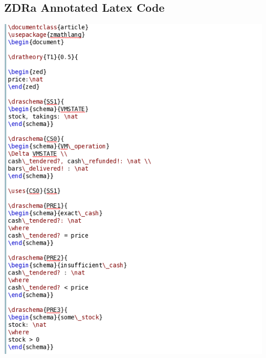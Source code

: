 \subsection{ZDRa Annotated Latex Code}
\label{app:vm2}
\includegraphics[scale=0.5]{examples/vm/2imagea.png}

